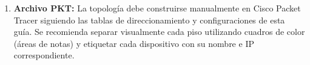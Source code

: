 \documentclass[letterpaper,11pt]{article}
\begin{document}
\begin{enumerate}
    \item \textbf{Archivo PKT:} La topología debe construirse manualmente en Cisco Packet Tracer siguiendo las tablas de direccionamiento y configuraciones de esta guía. Se recomienda separar visualmente cada piso utilizando cuadros de color (áreas de notas) y etiquetar cada dispositivo con su nombre e IP correspondiente.
\end{enumerate}
\end{document}

